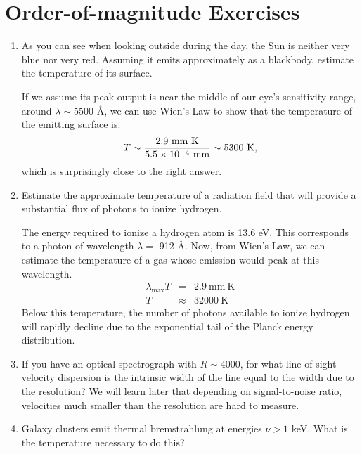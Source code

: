\section{Order-of-magnitude Exercises}

\begin{enumerate} 
\item As you can see when looking outside during the day, the Sun is
    neither very blue nor very red. Assuming it emits approximately as
    a blackbody, estimate the temperature of its surface.

\begin{answer}
If we assume its peak output is near the middle of our eye's
sensitivity range, around $\lambda \sim 5500$ \AA, we can use Wien's
Law to show that the temperature of the emitting surface is:
\begin{equation}
T \sim \frac{2.9 {\rm ~mm~K}}{5.5 \times 10^{-4} {\rm ~mm}} \sim 5300
{\rm ~K},
\end{equation}
which is surprisingly close to the right answer.
\end{answer}

\item Estimate the approximate temperature of a radiation field that
    will provide a substantial flux of photons to ionize hydrogen.

\begin{answer}
The energy required to ionize a hydrogen atom
is 13.6 eV. This corresponds to a photon of
wavelength $\lambda = $ 912 \AA. Now, from Wien's Law, we
can estimate the temperature of a gas whose emission would peak at
this wavelength.
\begin{eqnarray} 
\lambda_\textrm{max}T&=& 2.9\mathrm{~mm~K}\\
T&\approx& 32000 \mathrm{~K}
\end{eqnarray}
Below this temperature, the number of photons available to ionize
hydrogen will rapidly decline due to the exponential tail of the
Planck energy distribution.
\end{answer}

\item If you have an optical spectrograph with $R\sim 4000$, for what
line-of-sight velocity dispersion is the intrinsic width of the line
equal to the width due to the resolution?  We will learn later that
depending on signal-to-noise ratio, velocities much smaller than the
resolution are hard to measure.

\item Galaxy clusters emit thermal bremstrahlung at energies $\nu > 1$
keV. What is the temperature necessary to do this? 


\end{enumerate}
